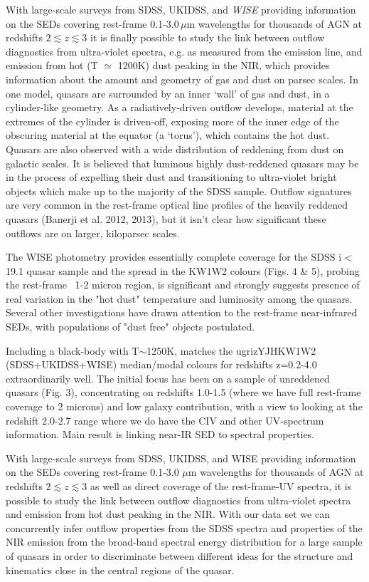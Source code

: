 With large-scale surveys from SDSS, UKIDSS, and \textit{WISE} providing information on the SEDs covering rest-frame 0.1-3.0\,$\mu$m wavelengths for thousands of AGN at redshifts $2 \lesssim z \lesssim 3$ it is finally possible to study the link between outflow diagnostics from ultra-violet spectra, e.g. as measured from the  emission line, and emission from hot (T $\simeq$ 1200K) dust peaking in the NIR, which provides information about the amount and geometry of gas and dust on parsec scales. 
In one model, quasars are surrounded by an inner `wall' of gas and dust, in a cylinder-like geometry. 
As a radiatively-driven outflow develops, material at the extremes of the cylinder is driven-off, exposing more of the inner edge of the obscuring material at the equator (a `torus'), which contains the hot dust. 
Quasars are also observed with a wide distribution of reddening from dust on galactic scales. 
It is believed that luminous highly dust-reddened quasars may be in the process of expelling their dust and transitioning to ultra-violet bright objects which make up to the majority of the SDSS sample. 
Outflow signatures are very common in the rest-frame optical \ha line profiles of the heavily reddened quasars (Banerji et al. 2012, 2013), but it isn't clear how significant these outflows are on larger, kiloparsec scales.

The WISE photometry provides essentially complete coverage for the SDSS i$<$19.1 quasar sample and the spread in the KW1W2 colours (Figs. 4 \& 5), probing the rest-frame ~1-2 micron region, is significant and strongly suggests presence of real variation in the "hot dust" temperature and luminosity among the quasars. 
Several other investigations have drawn attention to the rest-frame near-infrared SEDs, with populations of "dust free" objects postulated. 

Including a black-body with T$\sim$1250K, matches the ugrizYJHKW1W2 (SDSS+UKIDSS+WISE) median/modal colours for redshifts z=0.2-4.0 extraordinarily well. 
The initial focus has been on a sample of unreddened quasars (Fig. 3), concentrating on redshifts 1.0-1.5 (where we have full rest-frame coverage to 2 microns) and low galaxy contribution, with a view to looking at the redshift 2.0-2.7 range where we do have the CIV and other UV-spectrum information. 
Main result is linking near-IR SED to spectral properties.

With large-scale surveys from SDSS, UKIDSS, and WISE providing information on the SEDs covering rest-frame 0.1-3.0 $\mu$m wavelengths for thousands of AGN at redshifts $2 \lesssim z \lesssim 3$ as well as direct coverage of the rest-frame-UV spectra, it is possible to study the link between outflow diagnostics from ultra-violet spectra and emission from hot dust peaking in the NIR. With our data set we can concurrently infer outflow properties from the SDSS spectra and properties of the NIR emission from the broad-band spectral energy distribution for a large sample of quasars in order to discriminate between different ideas for the structure and kinematics close in the central regions of the quasar. 

